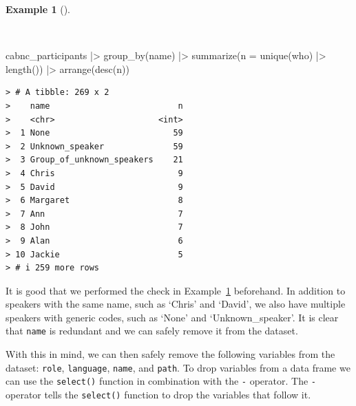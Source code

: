 \documentclass[
  letterpaper,
]{latex/krantz}
\newenvironment{Shaded}{\begin{snugshade}}{\end{snugshade}}
\newcommand{\AttributeTok}[1]{\textcolor[rgb]{0.00,0.00,0.00}{#1}}
\newcommand{\FunctionTok}[1]{\textcolor[rgb]{0.00,0.00,0.00}{#1}}
\newcommand{\NormalTok}[1]{\textcolor[rgb]{0.00,0.00,0.00}{#1}}
\newcommand{\SpecialCharTok}[1]{\textcolor[rgb]{0.00,0.00,0.00}{#1}}
\theoremstyle{definition}
\newtheorem{example}{Example}[chapter]
\theoremstyle{remark}
\begin{document}
\begin{example}[]\protect\hypertarget{exm-cd-cabnc-who-name}{}\label{exm-cd-cabnc-who-name}

~

\begin{Shaded}
\begin{Highlighting}[]
\NormalTok{cabnc\_participants }\SpecialCharTok{|\textgreater{}}
  \FunctionTok{group\_by}\NormalTok{(name) }\SpecialCharTok{|\textgreater{}}
  \FunctionTok{summarize}\NormalTok{(}\AttributeTok{n =} \FunctionTok{unique}\NormalTok{(who) }\SpecialCharTok{|\textgreater{}} \FunctionTok{length}\NormalTok{()) }\SpecialCharTok{|\textgreater{}}
  \FunctionTok{arrange}\NormalTok{(}\FunctionTok{desc}\NormalTok{(n))}
\end{Highlighting}
\end{Shaded}

\begin{verbatim}
> # A tibble: 269 x 2
>    name                          n
>    <chr>                     <int>
>  1 None                         59
>  2 Unknown_speaker              59
>  3 Group_of_unknown_speakers    21
>  4 Chris                         9
>  5 David                         9
>  6 Margaret                      8
>  7 Ann                           7
>  8 John                          7
>  9 Alan                          6
> 10 Jackie                        5
> # i 259 more rows
\end{verbatim}

\end{example}

It is good that we performed the check in
Example~\ref{exm-cd-cabnc-who-name} beforehand. In addition to speakers
with the same name, such as `Chris' and `David', we also have multiple
speakers with generic codes, such as `None' and `Unknown\_speaker'. It
is clear that \texttt{name} is redundant and we can safely remove it
from the dataset.

With this in mind, we can then safely remove the following variables
from the dataset: \texttt{role}, \texttt{language}, \texttt{name}, and
\texttt{path}. To drop variables from a data frame we can use the
\texttt{select()} function in combination with the \texttt{-} operator.
The \texttt{-} operator tells the \texttt{select()} function to drop the
variables that follow it.
\end{document}

